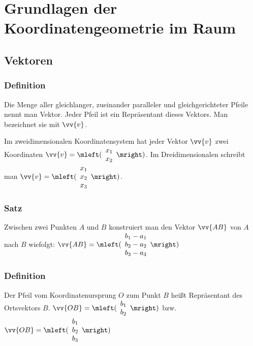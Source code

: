 \documentclass[a4paper,12pt]{article}
\begin{document}
\section{Grundlagen der Koordinatengeometrie im Raum}
\subsection{Vektoren}
\subsubsection{Definition}
Die Menge aller gleichlanger, zueinander paralleler und gleichgerichteter Pfeile nennt man Vektor. Jeder Pfeil ist ein Repräsentant dieses Vektors. Man bezeichnet sie mit $\vv{v}$.
\par
Im zweidimensionalen Koordinatensystem hat jeder Vektor $\vv{v}$ zwei Koordinaten $\vv{v}=\mleft( \begin{array}{c}
x_1 \\
x_2
\end{array} \mright)$. Im Dreidimensionalen schreibt man $\vv{v}=\mleft( \begin{array}{c}
x_1 \\
x_2 \\
x_3
\end{array} \mright)$.

\subsubsection{Satz}
Zwischen zwei Punkten $A$ und $B$ konstruiert man den Vektor $\vv{AB}$ von $A$ nach $B$ wiefolgt:
$\vv{AB}= \mleft( \begin{array}{c}
b_1-a_1 \\
b_2 - a_2 \\
b_3 - a_3
\end{array} \mright)$

\subsubsection{Definition}
Der Pfeil vom Koordinatenursprung $O$ zum Punkt $B$ heißt Repräsentant des Ortsvektors $B$. $\vv{OB}=\mleft(  \begin{array}{c}
b_1 \\
b_2
\end{array}  \mright)$ bzw. $\vv{OB}=\mleft(  \begin{array}{c}
b_1 \\
b_2 \\
b_3
\end{array}  \mright)$
\end{document}
